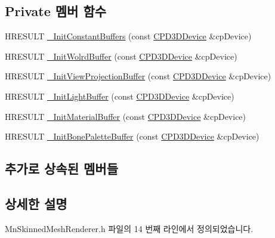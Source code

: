 \subsection*{Private 멤버 함수}
\begin{DoxyCompactItemize}
\item 
H\+R\+E\+S\+U\+LT \hyperlink{class_m_n_l_1_1_mn_skinned_mesh_renderer_a64bd2879e0dbe693a242c53d30c9c2da}{\+\_\+\+Init\+Constant\+Buffers} (const \hyperlink{namespace_m_n_l_a1eec210db8f309a4a9ac0d9658784c31}{C\+P\+D3\+D\+Device} \&cp\+Device)
\item 
H\+R\+E\+S\+U\+LT \hyperlink{class_m_n_l_1_1_mn_skinned_mesh_renderer_abe47b527d14518fe7534d93980e782a9}{\+\_\+\+Init\+Wolrd\+Buffer} (const \hyperlink{namespace_m_n_l_a1eec210db8f309a4a9ac0d9658784c31}{C\+P\+D3\+D\+Device} \&cp\+Device)
\item 
H\+R\+E\+S\+U\+LT \hyperlink{class_m_n_l_1_1_mn_skinned_mesh_renderer_aac45dc49c3d5978e1b4ce6fbd66ac9c3}{\+\_\+\+Init\+View\+Projection\+Buffer} (const \hyperlink{namespace_m_n_l_a1eec210db8f309a4a9ac0d9658784c31}{C\+P\+D3\+D\+Device} \&cp\+Device)
\item 
H\+R\+E\+S\+U\+LT \hyperlink{class_m_n_l_1_1_mn_skinned_mesh_renderer_a843dc43c74ef2e4923e3373baa8a3362}{\+\_\+\+Init\+Light\+Buffer} (const \hyperlink{namespace_m_n_l_a1eec210db8f309a4a9ac0d9658784c31}{C\+P\+D3\+D\+Device} \&cp\+Device)
\item 
H\+R\+E\+S\+U\+LT \hyperlink{class_m_n_l_1_1_mn_skinned_mesh_renderer_a57dd508b339049196877565d4b0b9e3f}{\+\_\+\+Init\+Material\+Buffer} (const \hyperlink{namespace_m_n_l_a1eec210db8f309a4a9ac0d9658784c31}{C\+P\+D3\+D\+Device} \&cp\+Device)
\item 
H\+R\+E\+S\+U\+LT \hyperlink{class_m_n_l_1_1_mn_skinned_mesh_renderer_a2cceb35172a7371e9c14ee6a819a4178}{\+\_\+\+Init\+Bone\+Palette\+Buffer} (const \hyperlink{namespace_m_n_l_a1eec210db8f309a4a9ac0d9658784c31}{C\+P\+D3\+D\+Device} \&cp\+Device)
\end{DoxyCompactItemize}
\subsection*{추가로 상속된 멤버들}


\subsection{상세한 설명}


Mn\+Skinned\+Mesh\+Renderer.\+h 파일의 14 번째 라인에서 정의되었습니다.




